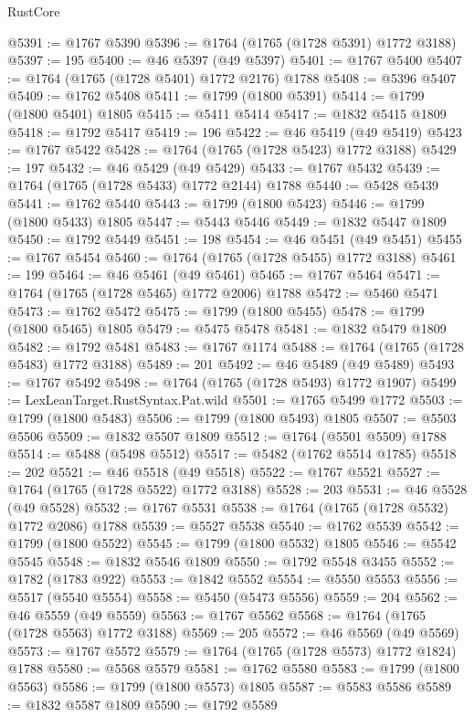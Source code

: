 \begin{lexlean}{RustCore}
\begin{coremodule}
@5391 := @1767 @5390
@5396 := @1764 (@1765 (@1728 @5391) @1772 @3188)
@5397 := 195
@5400 := @46 @5397 (@49 @5397)
@5401 := @1767 @5400
@5407 := @1764 (@1765 (@1728 @5401) @1772 @2176) @1788
@5408 := @5396 @5407
@5409 := @1762 @5408
@5411 := @1799 (@1800 @5391)
@5414 := @1799 (@1800 @5401) @1805
@5415 := @5411 @5414
@5417 := @1832 @5415 @1809
@5418 := @1792 @5417
@5419 := 196
@5422 := @46 @5419 (@49 @5419)
@5423 := @1767 @5422
@5428 := @1764 (@1765 (@1728 @5423) @1772 @3188)
@5429 := 197
@5432 := @46 @5429 (@49 @5429)
@5433 := @1767 @5432
@5439 := @1764 (@1765 (@1728 @5433) @1772 @2144) @1788
@5440 := @5428 @5439
@5441 := @1762 @5440
@5443 := @1799 (@1800 @5423)
@5446 := @1799 (@1800 @5433) @1805
@5447 := @5443 @5446
@5449 := @1832 @5447 @1809
@5450 := @1792 @5449
@5451 := 198
@5454 := @46 @5451 (@49 @5451)
@5455 := @1767 @5454
@5460 := @1764 (@1765 (@1728 @5455) @1772 @3188)
@5461 := 199
@5464 := @46 @5461 (@49 @5461)
@5465 := @1767 @5464
@5471 := @1764 (@1765 (@1728 @5465) @1772 @2006) @1788
@5472 := @5460 @5471
@5473 := @1762 @5472
@5475 := @1799 (@1800 @5455)
@5478 := @1799 (@1800 @5465) @1805
@5479 := @5475 @5478
@5481 := @1832 @5479 @1809
@5482 := @1792 @5481
@5483 := @1767 @1174
@5488 := @1764 (@1765 (@1728 @5483) @1772 @3188)
@5489 := 201
@5492 := @46 @5489 (@49 @5489)
@5493 := @1767 @5492
@5498 := @1764 (@1765 (@1728 @5493) @1772 @1907)
@5499 := LexLeanTarget.RustSyntax.Pat.wild
@5501 := @1765 @5499 @1772
@5503 := @1799 (@1800 @5483)
@5506 := @1799 (@1800 @5493) @1805
@5507 := @5503 @5506
@5509 := @1832 @5507 @1809
@5512 := @1764 (@5501 @5509) @1788
@5514 := @5488 (@5498 @5512)
@5517 := @5482 (@1762 @5514 @1785)
@5518 := 202
@5521 := @46 @5518 (@49 @5518)
@5522 := @1767 @5521
@5527 := @1764 (@1765 (@1728 @5522) @1772 @3188)
@5528 := 203
@5531 := @46 @5528 (@49 @5528)
@5532 := @1767 @5531
@5538 := @1764 (@1765 (@1728 @5532) @1772 @2086) @1788
@5539 := @5527 @5538
@5540 := @1762 @5539
@5542 := @1799 (@1800 @5522)
@5545 := @1799 (@1800 @5532) @1805
@5546 := @5542 @5545
@5548 := @1832 @5546 @1809
@5550 := @1792 @5548 @3455
@5552 := @1782 (@1783 @922)
@5553 := @1842 @5552
@5554 := @5550 @5553
@5556 := @5517 (@5540 @5554)
@5558 := @5450 (@5473 @5556)
@5559 := 204
@5562 := @46 @5559 (@49 @5559)
@5563 := @1767 @5562
@5568 := @1764 (@1765 (@1728 @5563) @1772 @3188)
@5569 := 205
@5572 := @46 @5569 (@49 @5569)
@5573 := @1767 @5572
@5579 := @1764 (@1765 (@1728 @5573) @1772 @1824) @1788
@5580 := @5568 @5579
@5581 := @1762 @5580
@5583 := @1799 (@1800 @5563)
@5586 := @1799 (@1800 @5573) @1805
@5587 := @5583 @5586
@5589 := @1832 @5587 @1809
@5590 := @1792 @5589

\end{coremodule}
\end{lexlean}
